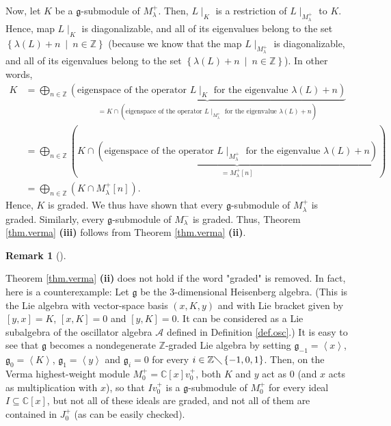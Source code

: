 \documentclass
[numbers=enddot,12pt,final,onecolumn,german,notitlepage]{scrartcl}%
\theoremstyle{definition}
\newtheorem{remk}[theo]{Remark}
\newenvironment{remark}[1][]
{\begin{remk}[#1]\begin{leftbar}}
{\end{leftbar}\end{remk}}
\begin{document}
Now, let $K$ be a $\mathfrak{g}$-submodule of $M_{\lambda}^{+}$. Then,
$L\mid_{K}$ is a restriction of $L\mid_{M_{\lambda}^{+}}$ to $K$. Hence, map
$L\mid_{K}$ is diagonalizable, and all of its eigenvalues belong to the set
$\left\{  \lambda\left(  L\right)  +n\ \mid\ n\in\mathbb{Z}\right\}  $
(because we know that the map $L\mid_{M_{\lambda}^{+}}$ is diagonalizable, and
all of its eigenvalues belong to the set $\left\{  \lambda\left(  L\right)
+n\ \mid\ n\in\mathbb{Z}\right\}  $). In other words,%
\begin{align*}
K  &  =\bigoplus\limits_{n\in\mathbb{Z}}\underbrace{\left(  \text{eigenspace
of the operator }L\mid_{K}\text{ for the eigenvalue }\lambda\left(  L\right)
+n\right)  }_{=K\cap\left(  \text{eigenspace of the operator }L\mid
_{M_{\lambda}^{+}}\text{ for the eigenvalue }\lambda\left(  L\right)
+n\right)  }\\
&  =\bigoplus\limits_{n\in\mathbb{Z}}\left(  K\cap\underbrace{\left(
\text{eigenspace of the operator }L\mid_{M_{\lambda}^{+}}\text{ for the
eigenvalue }\lambda\left(  L\right)  +n\right)  }_{=M_{\lambda}^{+}\left[
n\right]  }\right) \\
&  =\bigoplus\limits_{n\in\mathbb{Z}}\left(  K\cap M_{\lambda}^{+}\left[
n\right]  \right)  .
\end{align*}
Hence, $K$ is graded. We thus have shown that every $\mathfrak{g}$-submodule
of $M_{\lambda}^{+}$ is graded. Similarly, every $\mathfrak{g}$-submodule of
$M_{\lambda}^{-}$ is graded. Thus, Theorem \ref{thm.verma} \textbf{(iii)}
follows from Theorem \ref{thm.verma} \textbf{(ii)}.

\begin{remark}
Theorem \ref{thm.verma} \textbf{(ii)} does not hold if the word "graded" is
removed. In fact, here is a counterexample: Let $\mathfrak{g}$ be the
3-dimensional Heisenberg algebra. (This is the Lie algebra with vector-space
basis $\left(  x,K,y\right)  $ and with Lie bracket given by $\left[
y,x\right]  =K$, $\left[  x,K\right]  =0$ and $\left[  y,K\right]  =0$. It can
be considered as a Lie subalgebra of the oscillator algebra $\mathcal{A}$
defined in Definition \ref{def.osc}.) It is easy to see that $\mathfrak{g}$
becomes a nondegenerate $\mathbb{Z}$-graded Lie algebra by setting
$\mathfrak{g}_{-1}=\left\langle x\right\rangle $, $\mathfrak{g}_{0}%
=\left\langle K\right\rangle $, $\mathfrak{g}_{1}=\left\langle y\right\rangle
$ and $\mathfrak{g}_{i}=0$ for every $i\in\mathbb{Z}\diagdown\left\{
-1,0,1\right\}  $. Then, on the Verma highest-weight module $M_{0}%
^{+}=\mathbb{C}\left[  x\right]  v_{0}^{+}$, both $K$ and $y$ act as $0$ (and
$x$ acts as multiplication with $x$), so that $Iv_{0}^{+}$ is a $\mathfrak{g}%
$-submodule of $M_{0}^{+}$ for every ideal $I\subseteq\mathbb{C}\left[
x\right]  $, but not all of these ideals are graded, and not all of them are
contained in $J_{0}^{+}$ (as can be easily checked).
\end{remark}
\end{document}
